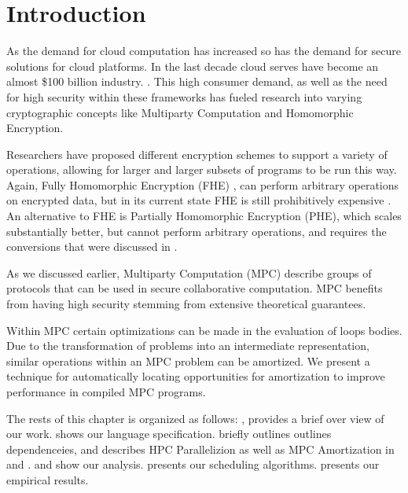 \section{Introduction}
\label{sec:intro}


As the demand for cloud computation has increased so has the demand for secure solutions 
for cloud platforms. In the last decade cloud serves have become an almost \$100 billion industry. 
\cite{Synergy2019}. This high consumer demand, as well as the need for high security within these
frameworks has fueled research into varying cryptographic concepts like Multiparty Computation and 
Homomorphic Encryption. 

Researchers have proposed different encryption schemes to support 
a variety of operations, allowing for larger and larger subsets of
programs to be run this way. Again, Fully Homomorphic Encryption (FHE) \cite{Gentry:2010},\cite{Gentry:20102}  
can perform arbitrary operations on encrypted data, but in its current state FHE
is still prohibitively expensive \cite{Gentry:2011}. An alternative to FHE 
is Partially Homomorphic Encryption (PHE), which scales substantially better, but cannot 
perform arbitrary operations, and requires the conversions that were discussed in .

As we discussed earlier, Multiparty Computation (MPC) describe groups of protocols that can be used in secure collaborative
computation. MPC benefits from having high security stemming from extensive theoretical guarantees. 

Within MPC certain optimizations can be made in the evaluation of loops bodies. Due to the transformation of problems into an 
intermediate representation, similar operations within an MPC problem can be amortized. %
We present a technique for automatically locating opportunities for amortization to improve performance in compiled MPC programs. 

The rests of this chapter is organized as follows: , provides a brief over view of our work. 
 shows our language specification.
 briefly outlines outlines dependenceies, and describes HPC Parallelizion as well as 
MPC Amortization in  and . 
 and  show our analysis.  
presents our scheduling algorithms.  presents our empirical results. 
